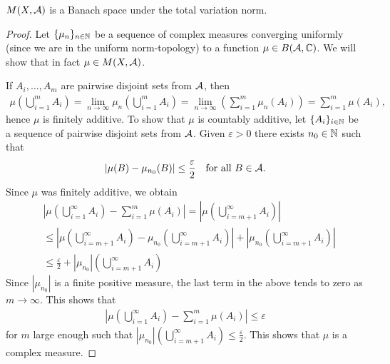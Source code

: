 \begin{theorem}
$M(X, \mathcal{A})$ is a Banach space under the total variation norm.
\end{theorem}
\begin{proof}
Let $\{\mu_{n}\}_{n\in \mathbb{N}}$ be a sequence of complex measures converging uniformly (since we are in the uniform norm-topology) to a function $\mu\in B(\mathcal{A},\mathbb{C})$. We will show that in fact $\mu\in M(X, \mathcal{A})$.

If $A_{i}, \dots, A_{m}$ are pairwise disjoint sets from $\mathcal{A}$, then
\begin{align*}
	\mu\left( \bigcup_{i=1}^{m} A_{i} \right)=\lim_{n\to \infty}\mu_{n}\left( \bigcup_{i=1}^{m} A_{i} \right)=\lim_{n\to \infty} \left( \sum_{i=1}^{m} \mu_{n}(A_{i}) \right)=\sum_{i=1}^{m}\mu(A_{i}),
\end{align*}
hence $\mu$ is finitely additive. To show that $\mu$ is countably additive, let $\{A_{i}\}_{i\in \mathbb{N}}$ be a sequence of pairwise disjoint sets from $\mathcal{A}$. Given $\varepsilon>0$ there exists $n_{0}\in \mathbb{N}$ such that
\begin{align*}
	|\mu(B) - \mu_{n_{0}}(B)| \le \frac{\varepsilon}{2} \quad \text{for all } B\in \mathcal{A}.
\end{align*}
Since $\mu$ was finitely additive, we obtain
\begin{align*}
	&\left| \mu\left( \bigcup_{i=1}^{\infty}A_{i} \right) - \sum_{i=1}^{m}\mu(A_{i}) \right| = \left|\mu\left( \bigcup_{i=m+1}^{\infty}A_{i} \right) \right| \\
	&\le \left| \mu\left( \bigcup_{i=m+1}^{\infty} A_{i} \right) - \mu_{n_{0}}\left( \bigcup_{i=m+1}^{\infty} A_{i} \right) \right| + \left| \mu_{n_{0}}\left( \bigcup_{i=m+1}^{\infty} A_{i} \right) \right| \\
	&\le \frac{\varepsilon}{2} + |\mu_{n_{0}}|\left( \bigcup_{i=m+1}^{\infty} A_{i} \right)
\end{align*}
Since $|\mu_{n_{0}}|$ is a finite positive measure, the last term in the above tends to zero as $m\to \infty$. This shows that
\begin{align*}
	\left| \mu\left( \bigcup_{i=1}^{\infty}A_{i} \right) - \sum_{i=1}^{m}\mu(A_{i}) \right| \le \varepsilon
\end{align*}
for $m$ large enough such that $|\mu_{n_{0}}|\left( \bigcup_{i=m+1}^{\infty} A_{i} \right)\le \frac{\varepsilon}{2}$. This shows that $\mu$ is a complex measure.
\end{proof}


